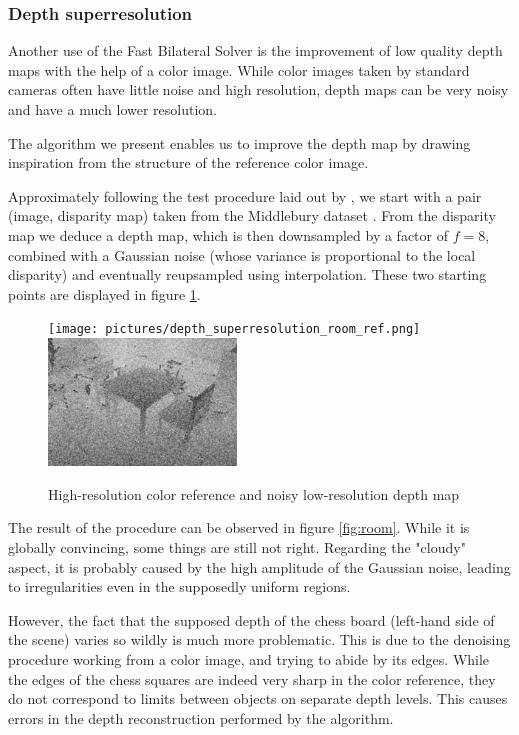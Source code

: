 \documentclass{article}
\begin{document}
\subsubsection{Depth superresolution}

Another use of the Fast Bilateral Solver is the improvement of low quality depth maps with the help of a color image. While color images taken by standard cameras often have little noise and high resolution, depth maps can be very noisy and have a much lower resolution.

The algorithm we present enables us to improve the depth map by drawing inspiration from the structure of the reference color image.

\medskip

Approximately following the test procedure laid out by \cite{ferstl_image_2013}, we start with a pair (image, disparity map) taken from the Middlebury dataset \cite{jiang_high-resolution_2014}. From the disparity map we deduce a depth map, which is then downsampled by a factor of $f=8$, combined with a Gaussian noise (whose variance is proportional to the local disparity) and eventually reupsampled using interpolation. These two starting points are displayed in figure \ref{fig:room_original}.

\begin{figure}
    \centering
    \texttt{[image: pictures/depth\_superresolution\_room\_ref.png]}
    \includegraphics[width=5cm]{pictures/depth_superresolution_room_target.png}
    \caption{High-resolution color reference and noisy low-resolution depth map}
    \label{fig:room_original}
\end{figure}

\medskip

The result of the procedure can be observed in figure \ref{fig:room}. While it is globally convincing, some things are still not right. Regarding the "cloudy" aspect, it is probably caused by the high amplitude of the Gaussian noise, leading to irregularities even in the supposedly uniform regions.

However, the fact that the supposed depth of the chess board (left-hand side of the scene) varies so wildly is much more problematic. This is due to the denoising procedure working from a color image, and trying to abide by its edges. While the edges of the chess squares are indeed very sharp in the color reference, they do not correspond to limits between objects on separate depth levels. This causes errors in the depth reconstruction performed by the algorithm.
\end{document}
